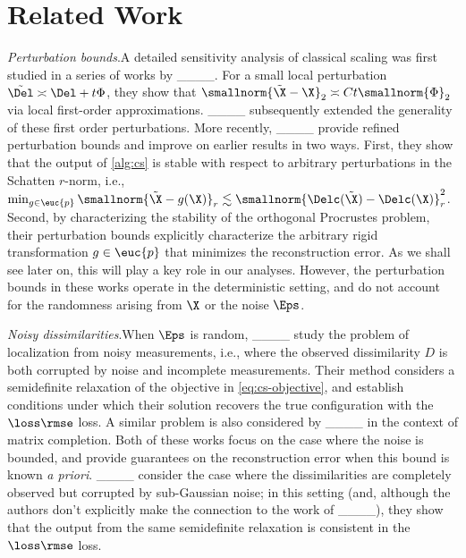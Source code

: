 \section{Related Work}
\label{sec:related-work}

\textit{Perturbation bounds}.\quad A detailed sensitivity analysis of classical scaling was first studied in a series of works by ____. For a small local perturbation {$\tilde{\Del} \asymp \Del + t\Phi$}, they show that {$\smallnorm{\tilde\X - \X}_2 \asymp C t \smallnorm{\Phi}_2$} via local first-order approximations. ____ subsequently extended the generality of these first order perturbations. More recently, ____ provide refined perturbation bounds and improve on earlier results in two ways. First, they show that the output of \cref{alg:cs} is stable with respect to arbitrary perturbations in the Schatten $r$-norm, i.e., ${\min_{g \in \euc{p}}\smallnorm{\tilde\X - g(\X)}_{r} \lesssim \smallnorm{\Delc(\tilde\X) - \Delc(\X)}_r^2}$. Second, by characterizing the stability of the orthogonal Procrustes problem, their  perturbation bounds explicitly characterize the arbitrary rigid transformation $g \in \euc{p}$ that minimizes the reconstruction error. As we shall see later on, this will play a key role in our analyses. However, the perturbation bounds in these works operate in the deterministic setting, and do not account for the randomness arising from $\X$ or the noise $\Eps$.

\textit{Noisy dissimilarities}.\quad When $\Eps$ is random, ____ study the problem of localization from noisy measurements, i.e., where the observed dissimilarity $D$ is both corrupted by noise and incomplete measurements. Their method considers a semidefinite relaxation of the objective in \cref{eq:cs-objective}, and establish conditions under which their solution recovers the true configuration with the $\loss\rmse$ loss. A similar problem is also considered by ____ in the context of matrix completion. Both of these works focus on the case where the noise is bounded, and provide guarantees on the reconstruction error when this bound is known \textit{a priori}. ____ consider the case where the dissimilarities are completely observed but corrupted by \iid{} sub-Gaussian noise; in this setting (and, although the authors don't explicitly make the connection to the work of  ____), they show that the output from the same semidefinite relaxation is consistent in the $\loss\rmse$ loss.

